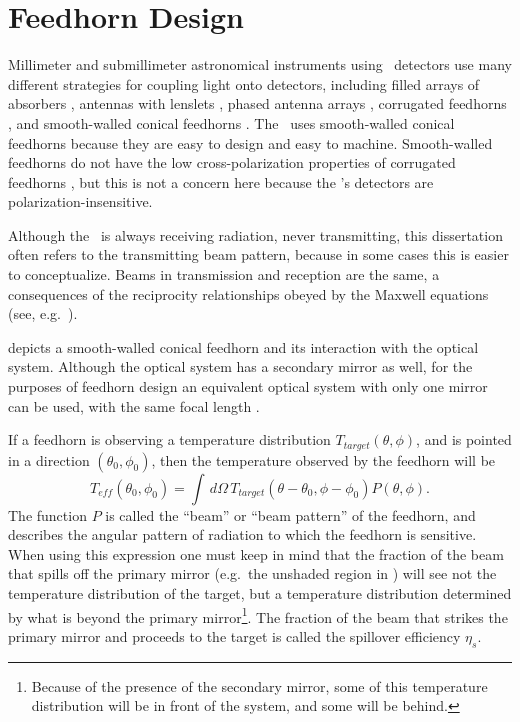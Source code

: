 
\section{Feedhorn Design}\label{sec:ch4-feedhorn-design}

Millimeter and submillimeter astronomical instruments using \TES\ detectors use many different strategies for coupling light onto detectors, including filled arrays of absorbers \cite{swetz_overview_2011,holland_scuba-2:_2013}, antennas with lenslets \cite{keating_ultra_2011}, phased antenna arrays \cite{obrient_antenna-coupled_2012}, corrugated feedhorns \cite{austermann_sptpol:_2012,niemack_actpol:_2010}, and smooth-walled conical feedhorns \cite{schwan_invited_2011,carlstrom_10_2011}.
The \Imager\ uses smooth-walled conical feedhorns because they are easy to design and easy to machine.
Smooth-walled feedhorns do not have the low cross-polarization properties of corrugated feedhorns \cite{clarricoats_corrugated_1984}, but this is not a concern here because the \Imager's detectors are polarization-insensitive.

Although the \Imager\ is always receiving radiation, never transmitting, this dissertation often refers to the transmitting beam pattern, because in some cases this is easier to conceptualize.
Beams in transmission and reception are the same, a consequences of the reciprocity relationships obeyed by the Maxwell equations (see, e.g.\ \cite{balanis_antenna_2005}).

 depicts a smooth-walled conical feedhorn and its interaction with the optical system.
Although the optical system has a secondary mirror as well, for the purposes of feedhorn design an equivalent optical system with only one mirror can be used, with the same focal length \cite{goldsmith_quasioptical_1998}.

If a feedhorn is observing a temperature distribution $T_{target}(\theta,\phi)$, and is pointed in a direction $(\theta_0, \phi_0)$, then the temperature observed by the feedhorn will be
\begin{equation}
    T_{eff}(\theta_0,\phi_0) = \int \, d \Omega \, T_{target}(\theta - \theta_0,\phi - \phi_0) P(\theta,\phi).
\end{equation}
The function $P$ is called the ``beam'' or ``beam pattern'' of the feedhorn, and describes the angular pattern of radiation to which the feedhorn is sensitive.
When using this expression one must keep in mind that the fraction of the beam that spills off the primary mirror (e.g.\ the unshaded region in ) will see not the temperature distribution of the target, but a temperature distribution determined by what is beyond the primary mirror\footnote{Because of the presence of the secondary mirror, some of this temperature distribution will be in front of the system, and some will be behind.}.
The fraction of the beam that strikes the primary mirror and proceeds to the target is called the spillover efficiency $\eta_s$.

